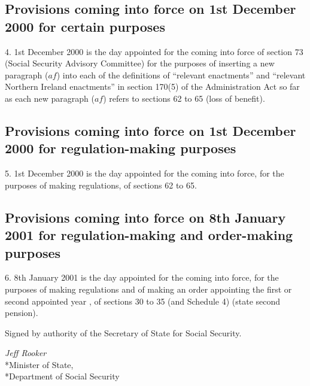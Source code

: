 \documentclass[12pt,a4paper]{article}
\begin{document}
\subsection[4. Provisions coming into force on 1st December 2000 for certain purposes]{Provisions coming into force on 1st December 2000 for certain purposes}

4.  1st December 2000 is the day appointed for the coming into force of section 73 (Social Security Advisory Committee) for the purposes of inserting a new paragraph ($af$)  into each of the definitions of “relevant enactments” and “relevant Northern Ireland enactments” in section 170(5) of the Administration Act so far as each new paragraph ($af$)  refers to sections 62 to 65 (loss of benefit).

\subsection[5. Provisions coming into force on 1st December 2000 for regulation-making purposes]{Provisions coming into force on 1st December 2000 for regulation\hspace{0pt}-making purposes}

5.  1st December 2000 is the day appointed for the coming into force, for the purposes of making regulations, of sections 62 to 65.

\subsection[6. Provisions coming into force on 8th January 2001 for regulation-making and order-making purposes]{Provisions coming into force on 8th January 2001 for regulation\hspace{0pt}-making and order-making purposes}

6.  8th January 2001 is the day appointed for the coming into force, for the purposes of making regulations and of making 
an order appointing the first or second appointed year%
, of sections 30 to 35 (and Schedule 4) (state second pension). 


\bigskip

Signed 
by authority of the Secretary of State for Social Security.

{\raggedleft
\emph{Jeff Rooker}\\*Minister of State,\\*Department of Social Security

}
\end{document}
